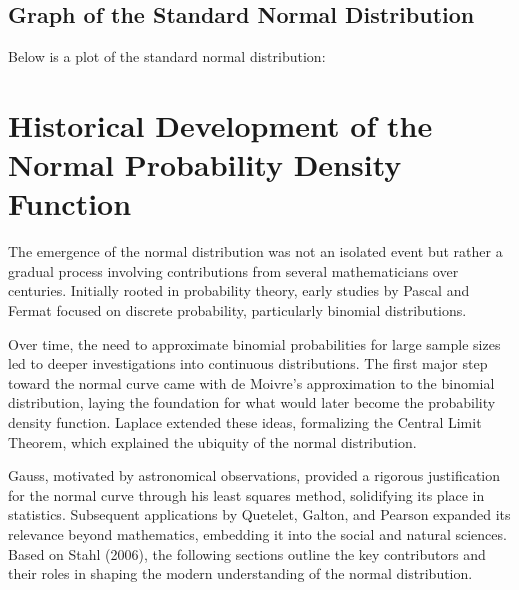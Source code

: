 \documentclass{article}
\begin{document}
\subsection{Graph of the Standard Normal Distribution}
Below is a plot of the standard normal distribution:

\begin{center}
\end{center}

\section{Historical Development of the Normal Probability Density Function}

The emergence of the normal distribution was not an isolated event but rather a gradual process involving contributions from several mathematicians over centuries. Initially rooted in probability theory, early studies by Pascal and Fermat focused on discrete probability, particularly binomial distributions.

Over time, the need to approximate binomial probabilities for large sample sizes led to deeper investigations into continuous distributions. The first major step toward the normal curve came with de Moivre’s approximation to the binomial distribution, laying the foundation for what would later become the probability density function. Laplace extended these ideas, formalizing the Central Limit Theorem, which explained the ubiquity of the normal distribution.

Gauss, motivated by astronomical observations, provided a rigorous justification for the normal curve through his least squares method, solidifying its place in statistics. Subsequent applications by Quetelet, Galton, and Pearson expanded its relevance beyond mathematics, embedding it into the social and natural sciences. Based on Stahl (2006), the following sections outline the key contributors and their roles in shaping the modern understanding of the normal distribution.
\end{document}
